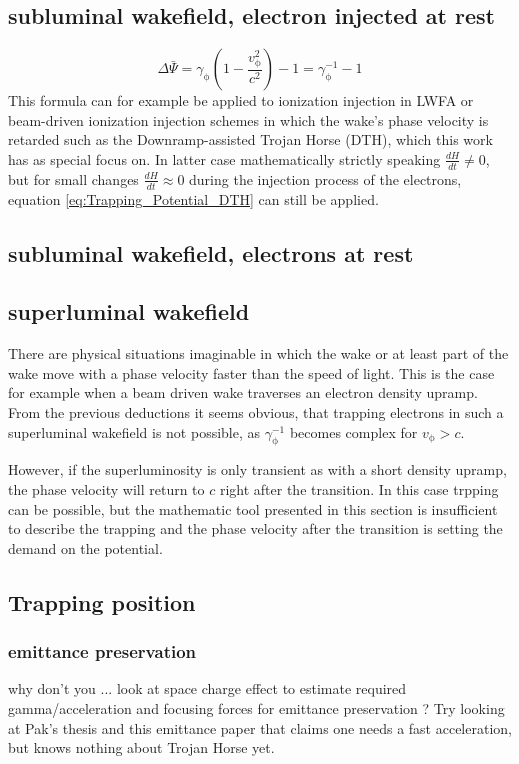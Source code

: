\subsection*{subluminal wakefield, electron injected at rest}

\begin{equation}
\label{eq:Trapping_Potential_DTH}
\Delta \bar{\Psi}=\gamma_\mathrm{\phi}(1-\frac{v_\mathrm{\phi}^2}{c^2})-1=\gamma_\mathrm{\phi}^{-1}-1
\end{equation}
This formula can for example be applied to ionization injection in LWFA\cite{PakPRL2012} or beam-driven ionization injection schemes in which the wake's phase velocity is retarded such as the Downramp-assisted Trojan Horse (DTH)\cite{DTH}, which this work has as special focus on. In latter case mathematically strictly speaking $\frac{d H}{dt}\neq0 $, but for small changes $\frac{dH}{dt}\approx 0$ during the injection process of the electrons, equation \ref{eq:Trapping_Potential_DTH} can still be applied.
\subsection*{subluminal wakefield, electrons at rest}

\subsection*{superluminal wakefield}
There are physical situations imaginable in which the wake or at least part of the wake move with a phase velocity faster than the speed of light. This is the case for example when a beam driven wake traverses an electron density upramp.
From the previous deductions it seems obvious, that trapping electrons in such a superluminal wakefield is not possible, as $\gamma_\mathrm{\phi}^{-1}$ becomes complex for $v_\mathrm{\phi}>c$.

However, if the superluminosity is only transient as with a short density upramp, the phase velocity will return to $c$ right after the transition. In this case trpping can be possible, but the mathematic tool presented in this section is insufficient to describe the trapping and the phase velocity after the transition is setting the demand on the potential.
\subsection{Trapping position}
\subsubsection{emittance preservation}
why don't you ... look at space charge effect to estimate required gamma/acceleration and focusing forces for emittance preservation ? Try looking at Pak's thesis and this emittance paper that claims one needs a fast acceleration, but knows nothing about Trojan Horse yet.
